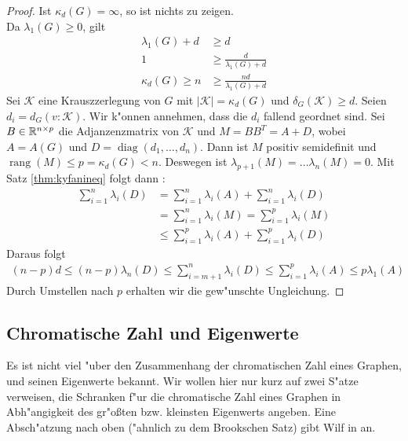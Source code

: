 \begin{proof}
  Ist $\kappa_{d}(G) = \infty$, so ist nichts zu zeigen. \\
   Da $\lambda_{1}(G) \geq 0$, gilt 
  \begin{align*}
    \lambda_{1}(G) + d &\geq d \\
    1 &\geq \frac{d}{\lambda_{1}(G) + d }\\
    \kappa_{d}(G) \geq n &\geq \frac{nd}{\lambda_{1}(G)+d}
  \end{align*}
  Sei $\mathcal{K}$ eine Krauszzerlegung von $G$ mit $|\mathcal{K}| = \kappa_{d}(G)$ und $\delta_{G}(\mathcal{K}) \geq d$. Seien $d_{i} = d_{G}(v:\mathcal{K})$. Wir k"onnen annehmen, dass die $d_{i}$ fallend geordnet sind. Sei $B\in {\mathbb{R}}^{n\times p}$ die Adjanzenzmatrix von $\mathcal{K}$ und $M = BB^{T} = A+D$, wobei $A= A(G)$ und $D = \operatorname{diag}(d_{1},\dots,d_n)$.
  Dann ist $M$ positiv semidefinit und $\operatorname{rang} (M) \leq p = \kappa_{d}(G) < n $. Deswegen ist $\lambda_{p+1}(M) = \dots \lambda_{n}(M) = 0$. 
  Mit Satz \ref{thm:kyfanineq} folgt dann : 
  \begin{align*}
    \sum\limits_{i=1}^{n} \lambda_{i}(D) &=\sum\limits_{i=1}^{n} \lambda_{i}(A) +\sum\limits_{i=1}^{n}  \lambda_{i}(D) \\
    &=\sum\limits_{i=1}^{n} \lambda_{i}(M) =\sum\limits_{i=1}^{p} \lambda_{i}(M) \\
    &\leq \sum\limits_{i=1}^{p} \lambda_{i}(A) +\sum\limits_{i=1}^{p} \lambda_{i}(D)
  \end{align*}
  Daraus folgt 
  \begin{align*}
    (n-p) d \leq (n-p) \lambda_n(D) \leq \sum\limits_{i=m+1}^{n} \lambda_{i}(D) \leq\sum\limits_{i=1}^{p} \lambda_{i}(A) \leq p\lambda_{1}(A)
  \end{align*}
  Durch Umstellen nach $p$ erhalten wir die gew"unschte Ungleichung.
\end{proof}

\subsection{Chromatische Zahl und Eigenwerte}
Es ist nicht viel "uber den Zusammenhang der chromatischen Zahl eines Graphen, und seinen Eigenwerte bekannt. Wir wollen hier nur kurz auf zwei S"atze verweisen, die Schranken f"ur die chromatische Zahl eines Graphen in Abh"angigkeit des gr"o{\ss}ten bzw. kleinsten Eigenwerts angeben. Eine Absch"atzung nach oben ("ahnlich zu dem Brookschen Satz) gibt Wilf in \cite{wilf1967eigenvalues} an.

